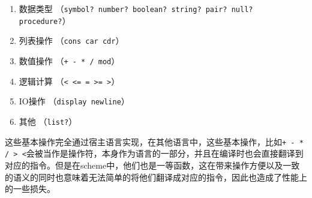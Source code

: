 \begin{enumerate}
\item 数据类型 （\texttt{symbol? number? boolean? string? pair? null? procedure?}）
\item 列表操作 （\texttt{cons car cdr}）
\item 数值操作 （\texttt{+ - * / mod}）
\item 逻辑计算 （\texttt{< <= = >= >}）
\item IO操作 （\texttt{display newline}）
\item 其他 （\texttt{list?}）
\end{enumerate}

这些基本操作完全通过宿主语言实现，在其他语言中，这些基本操作，比如\texttt{+ - * / > <}会被当作是操作符，本身作为语言的一部分，并且在编译时也会直接翻译到对应的指令。但是在scheme中，他们也是一等函数，这在带来操作方便以及一致的语义的同时也意味着无法简单的将他们翻译成对应的指令，因此也造成了性能上的一些损失。